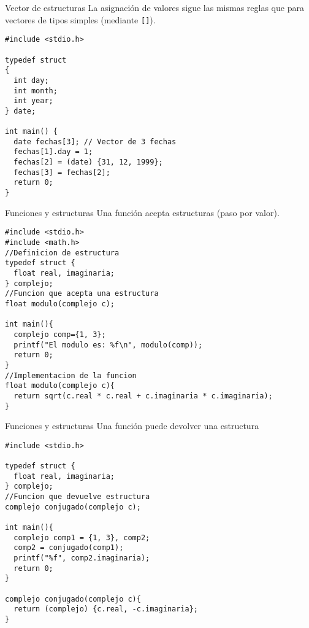 \documentclass[xcolor={usenames,svgnames,dvipsnames}, aspectratio=169]{beamer}
\begin{document}
\begin{frame}[label={sec:org835f34a},fragile,plain]{Vector de estructuras}
 La asignación de valores sigue las mismas reglas que para vectores de tipos simples (mediante \texttt{[]}).
\lstset{language=C,label= ,caption= ,captionpos=b,numbers=none}
\begin{lstlisting}
#include <stdio.h>

typedef struct
{
  int day;
  int month;
  int year;
} date;

int main() {
  date fechas[3]; // Vector de 3 fechas
  fechas[1].day = 1;
  fechas[2] = (date) {31, 12, 1999};
  fechas[3] = fechas[2];
  return 0;
}
\end{lstlisting}
\end{frame}

\begin{frame}[label={sec:orgc55411f},fragile,plain]{Funciones y estructuras}
 Una función acepta estructuras (\alert{paso por valor}).

\lstset{language=C,label= ,caption= ,captionpos=b,numbers=none}
\begin{lstlisting}
#include <stdio.h>
#include <math.h>
//Definicion de estructura
typedef struct {
  float real, imaginaria;
} complejo;
//Funcion que acepta una estructura
float modulo(complejo c);

int main(){
  complejo comp={1, 3};
  printf("El modulo es: %f\n", modulo(comp));
  return 0;
}
//Implementacion de la funcion
float modulo(complejo c){
  return sqrt(c.real * c.real + c.imaginaria * c.imaginaria);
}
\end{lstlisting}
\end{frame}

\begin{frame}[label={sec:orgffef8e6},fragile,plain]{Funciones y estructuras}
 Una función puede devolver una estructura

\lstset{language=C,label= ,caption= ,captionpos=b,numbers=none}
\begin{lstlisting}
#include <stdio.h>

typedef struct {
  float real, imaginaria;
} complejo;
//Funcion que devuelve estructura
complejo conjugado(complejo c);

int main(){
  complejo comp1 = {1, 3}, comp2;
  comp2 = conjugado(comp1);
  printf("%f", comp2.imaginaria);
  return 0;
}

complejo conjugado(complejo c){
  return (complejo) {c.real, -c.imaginaria}; 
}
\end{lstlisting}
\end{frame}
\end{document}
